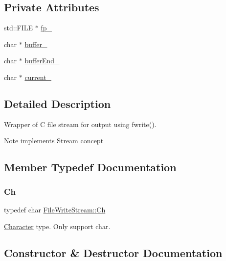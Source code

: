 \subsection*{Private Attributes}
\begin{DoxyCompactItemize}
\item 
std\+::\+F\+I\+LE $\ast$ \hyperlink{classFileWriteStream_aac23a58bdaa601d276c57b5bcf5b0246}{fp\+\_\+}
\item 
char $\ast$ \hyperlink{classFileWriteStream_a6a1f0fed15eb38f22935f11af493972f}{buffer\+\_\+}
\item 
char $\ast$ \hyperlink{classFileWriteStream_a1f30d1c653f30ca6e069cefb80881c75}{buffer\+End\+\_\+}
\item 
char $\ast$ \hyperlink{classFileWriteStream_a3b3ba8e5deef1b12f0662e9031f05c71}{current\+\_\+}
\end{DoxyCompactItemize}


\subsection{Detailed Description}
Wrapper of C file stream for output using fwrite(). 

\begin{DoxyNote}{Note}
implements Stream concept 
\end{DoxyNote}


\subsection{Member Typedef Documentation}
\mbox{\label{classFileWriteStream_abc16aeb69ad4176263ddfcb837fb7b49}} 
\subsubsection{\texorpdfstring{Ch}{Ch}}
{\footnotesize\ttfamily typedef char \hyperlink{classFileWriteStream_abc16aeb69ad4176263ddfcb837fb7b49}{File\+Write\+Stream\+::\+Ch}}



\hyperlink{structCharacter}{Character} type. Only support char. 



\subsection{Constructor \& Destructor Documentation}
\mbox{\label{classFileWriteStream_a553ea3e7377a7f7cace2daa3cc90e1a1}} 
